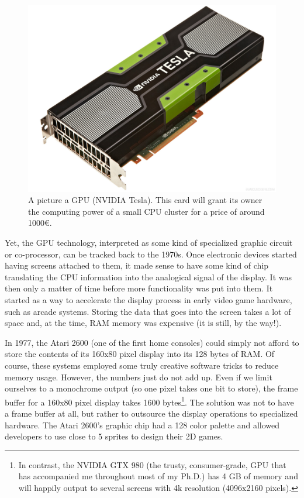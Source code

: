 \documentclass[twoside,openright,titlepage,numbers=noenddot,%
headinclude,footinclude,cleardoublepage=empty,abstract=on,
BCOR=5mm,fontsize=11pt, dvipsnames, paper=b5
]{scrreprt}
\newcommand{\gpu}{\gls{GPU}\xspace}
\begin{document}
\begin{figure}
  \centering
  \includegraphics[width=\textwidth]{gpu_and_me}
  \caption[ ]{A picture a GPU (NVIDIA Tesla). This card will grant its owner the computing power of a small CPU cluster for a price of around 1000€.}
  \label{fig:gpuandme}
\end{figure}

Yet, the \gpu technology, interpreted as some kind of specialized graphic circuit or co-processor, can be tracked back to the 1970s. Once electronic devices started having screens attached to them, it made sense to have some kind of chip translating the CPU information into the analogical signal of the display. It was then only a matter of time before more functionality was put into them. It started as a way to accelerate the display process in early video game hardware, such as arcade systems.
Storing the data that goes into the screen takes a lot of space and, at the time, RAM memory was expensive (it is still, by the way!).

In 1977, the Atari 2600 (one of the first home consoles) could simply not afford to store the contents of its 160x80 pixel display into its 128 bytes of RAM. Of course, these systems employed some truly creative software tricks to reduce memory usage. However, the numbers just do not add up. Even if we limit ourselves to a monochrome output (so one pixel takes one bit to store), the frame buffer for a 160x80 pixel display takes 1600 bytes\footnote{In contrast, the NVIDIA GTX 980 (the trusty, consumer-grade, GPU that has accompanied me throughout most of my Ph.D.) has 4 GB of memory and will happily output to several screens with 4k resolution (4096x2160 pixels).}.
The solution was not to have a frame buffer at all, but rather to outsource the display operations to specialized hardware. The Atari 2600's graphic chip had a 128 color palette and allowed developers to use close to 5 sprites to design their 2D games.
\end{document}
